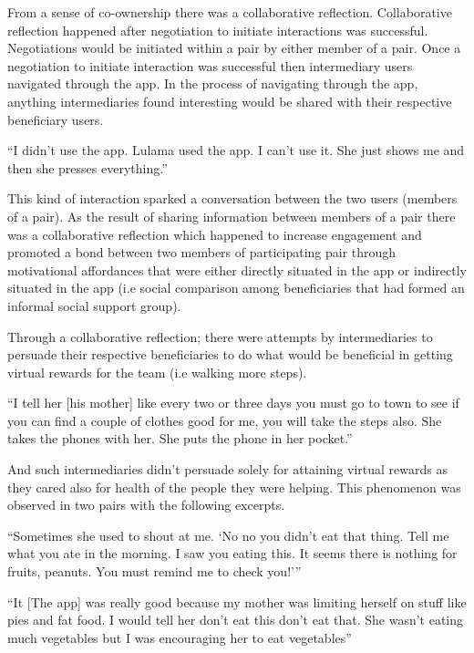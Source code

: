 From a sense of co-ownership there was a collaborative reflection. Collaborative reflection happened after negotiation to initiate interactions was successful. Negotiations would be initiated within a pair by either member of a pair. Once a negotiation to initiate interaction was successful then intermediary users navigated through the app. In the process of navigating through the app, anything intermediaries found interesting would be shared with their respective beneficiary users.

 {``I didn't use the app. Lulama used the app. I can't use it. She just shows me and then she presses everything.''}

This kind of interaction sparked a conversation between the two users (members of a pair). As the result of sharing information between members of a pair there was a collaborative reflection which happened to increase engagement and promoted a bond between two members of participating pair through motivational affordances that were either directly situated in the app or indirectly situated in the app (i.e social comparison among beneficiaries that had formed an informal social support group).

Through a collaborative reflection; there were attempts by intermediaries to  persuade their respective beneficiaries to do what would be beneficial in getting virtual rewards for the team (i.e walking more steps).

 {``I tell her [his mother] like every two or three days you must go to town to see if you can find a couple of clothes good for me, you will take the steps also. She takes the phones with her. She puts the phone in her pocket.''}

And such intermediaries didn't persuade solely for attaining virtual rewards as they cared  also for health of the people they were helping. This phenomenon was observed in two pairs with the following excerpts.

 {``Sometimes she used to shout at me. `No no you didn't eat that thing. Tell me what you ate in the morning. I saw you eating this. It seems there is nothing for fruits, peanuts. You must remind me to check you!'''}

{``It [The app] was really good because my mother was limiting herself on stuff like pies and fat food. I would tell her don't eat this don't eat that. She wasn't eating much vegetables but I was encouraging her to eat vegetables''}

